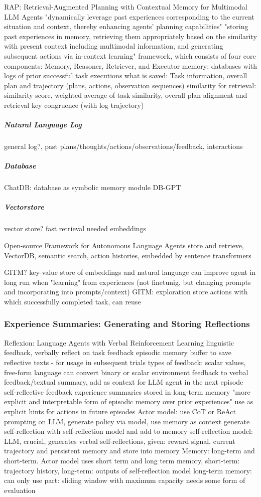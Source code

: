 \documentclass{article}
\begin{document}
\cite{kagaya_rap_2024} RAP: Retrieval-Augmented Planning with Contextual Memory for Multimodal LLM Agents
"dynamically leverage past experiences corresponding to the current situation and context, thereby enhancing agents’ planning capabilities"
"storing past experiences in memory, retrieving them appropriately based on the similarity with present context including multimodal information, and generating subsequent actions via in-context learning"
framework, which consists of four core components: Memory, Reasoner, Retriever, and Executor
memory: databases with logs of prior successful task executions
what is saved: Task information, overall plan and trajectory (plans, actions, observation sequences)
similarity for retrieval: similarity score, weighted average of task similarity, overall plan alignment and retrieval key congruence (with log trajectory)


\subparagraph{Natural Language Log}
general log?, past plans/thoughts/actions/observations/feedback, interactions

\subparagraph{Database}
ChatDB: database as symbolic memory module
DB-GPT

\subparagraph{Vectorstore}
vector store? fast retrieval needed
embeddings

\cite{zhou_agents_2023} Open-source Framework for Autonomous Language Agents
store and retrieve, VectorDB, semantic search, action histories, embedded by sentence transformers

GITM? key-value store of embeddings and natural language
can improve agent in long run when "learning" from experiences (not finetunig, but changing prompts and incorporating into prompts/context)
GITM: exploration store actions with which successfully completed task, can reuse

\subsubsection{Experience Summaries: Generating and Storing Reflections}

\cite{shinn_reflexion_2023} Reflexion: Language Agents with Verbal Reinforcement Learning
linguistic feedback, verbally reflect on task feedback
episodic memory buffer to save reflective texts - for usage in subsequent trials
types of feedback: scalar values, free-form language
can convert binary or scalar environment feedback to verbal feedback/textual summary, add as context for LLM agent in the next episode
self-reflective feedback
experience summaries stored in long-term memory
"more explicit and interpretable form of episodic memory over prior experiences" use as explicit hints for actions in future episodes
Actor model: use CoT or ReAct prompting on LLM, generate policy via model, use memory as context
generate self-reflection with self-reflection model and add to memory
self-reflection model: LLM, crucial, generates verbal self-reflections, given: reward signal, current trajectory and persistent memory and store into memory
Memory: long-term and short-term. Actor model uses short term and long term memory, short-term: trajectory history, long-term: outputs of self-reflection model
long-term memory: can only use part: sliding window with maximum capacity
needs some form of evaluation
\end{document}
